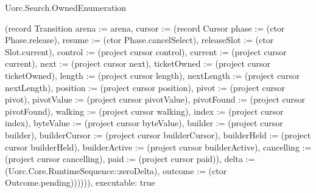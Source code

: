 \begin{lexlean}{Uorc.Search.OwnedEnumeration}
\begin{semanticmodule}
{(record Transition {arena := arena, cursor := (record Cursor {phase := (ctor Phase.release), resume := (ctor Phase.cancelSelect), releaseSlot := (ctor Slot.current), control := (project cursor control), current := (project cursor current), next := (project cursor next), ticketOwned := (project cursor ticketOwned), length := (project cursor length), nextLength := (project cursor nextLength), position := (project cursor position), pivot := (project cursor pivot), pivotValue := (project cursor pivotValue), pivotFound := (project cursor pivotFound), walking := (project cursor walking), index := (project cursor index), byteValue := (project cursor byteValue), builder := (project cursor builder), builderCursor := (project cursor builderCursor), builderHeld := (project cursor builderHeld), builderActive := (project cursor builderActive), cancelling := (project cursor cancelling), paid := (project cursor paid)}), delta := (Uorc.Core.RuntimeSequence::zeroDelta), outcome := (ctor Outcome.pending)}))))),
  executable: true
}


\end{semanticmodule}
\end{lexlean}
